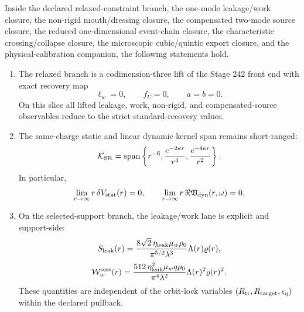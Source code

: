 \begin{theorem}
\label{thm:app-part08-main}
Inside the declared relaxed-constraint branch, the one-mode leakage/work closure, the non-rigid mouth/dressing closure, the compensated two-mode source closure, the reduced one-dimensional event-chain closure, the characteristic crossing/collapse closure, the microscopic cubic/quintic export closure, and the physical-calibration companion, the following statements hold.
\begin{enumerate}[leftmargin=2.2em]
  \item The relaxed branch is a codimension-three lift of the Stage 242 front end with exact recovery map
  \begin{equation}
  \label{eq:app-part08-main-recovery-map}
  \ell_w=0,
  \qquad
  f_U=0,
  \qquad
  a=b=0.
  \end{equation}
  On this slice all lifted leakage, work, non-rigid, and compensated-source observables reduce to the strict standard-recovery values.
  \item The same-charge static and linear dynamic kernel span remains short-ranged:
  \begin{equation}
  \label{eq:app-part08-main-short-range-span}
  \mathcal K_{\rm SR}
  =
  \operatorname{span}\left\{
  r^{-6},
  \frac{e^{-2\kappa r}}{r^4},
  \frac{e^{-4\kappa r}}{r^2}
  \right\}.
  \end{equation}
  In particular,
  \begin{equation}
  \label{eq:app-part08-main-short-range-limits}
  \lim_{r\to\infty}r\,\delta V_{\rm stat}(r)=0,
  \qquad
  \lim_{r\to\infty}r\,\Re\mathfrak V_{\rm dyn}(r,\omega)=0.
  \end{equation}
  \item On the selected-support branch, the leakage/work lane is explicit and support-side:
  \begin{equation}
  \label{eq:app-part08-main-leak-support}
  S_{\rm leak}(r)
  =
  \frac{8\sqrt2\,\eta_{\rm leak}\mu_w\rho_0}{\pi^{5/2}\lambda^3}
  \Lambda(r)\varrho(r),
  \end{equation}
  \begin{equation}
  \label{eq:app-part08-main-work-support}
  \mathcal W_w^{\rm sess}(r)
  =
  \frac{512\,\eta_{\rm leak}^{2}\mu_w q\rho_0}{\pi^4\lambda^2}
  \Lambda(r)^2\varrho(r)^2.
  \end{equation}
  These quantities are independent of the orbit-lock variables \((R_{\rm tr},R_{\rm target},\epsilon_\eta)\) within the declared pullback.

\end{enumerate}
\end{theorem}
